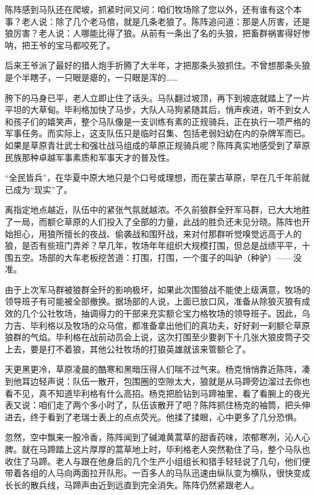 \par 陈阵感到马队还在爬坡，抓紧时间又问：咱们牧场除了您以外，还有谁有这个本事？老人说：除了几个老马倌，就是几条老狼了。陈阵追问道：那是人厉害，还是狼厉害？老人说：人哪能比得了狼。从前有一条出了名的头狼，把畜群祸害得好惨呐，把王爷的宝马都咬死了。
\par 后来王爷派了最好的猎人炮手折腾了大半年，才把那条头狼抓住。不曾想那条头狼是个半瞎子，一只眼是瘪的，一只眼是浑的……
\par 胯下的马身已平，老人立即止住了话头。马队翻过坡顶，再下到坡底就踏上了一片平坦的大草甸。毕利格加快了马步，大队人马狗紧随其后，悄声疾进，听不到女人和孩子们的嬉笑声，整个马队像是一支训练有素的正规骑兵，正在执行一项严格的军事任务。而实际上，这支队伍只是临时召集、包括老弱妇幼在内的杂牌军而已。如果是草原青壮武士和强壮战马组成的草原正规骑兵呢？陈阵真实地感受到了草原民族那种卓越军事素质和军事天才的普及性。
\par “全民皆兵”，在华夏中原大地只是个口号或理想，而在蒙古草原，早在几千年前就已成为“现实”了。
\par 离指定地点越近，队伍中的紧张气氛就越浓。不久前狼群全歼军马群，已大大地胜了一局，而额仑草原的人们投入了全部的力量，此战的胜负还未见分晓。陈阵也开始担心，用狼所擅长的夜战、偷袭战和围歼战，来对付那群听觉嗅觉远高于人的狼，是否有些班门弄斧？早几年，牧场年年组织大规模打围，但总是战绩平平，十围五空。场部的大车老板挖苦道：打围，打围，一个蛋子的叫驴（种驴）——没准。
\par 由于上次军马群被狼群全歼的影响极坏，如果此次围狼战不能使上级满意，牧场的领导班子有可能被全部撤换。据场部的人说，上面已放口风，准备从除狼灭狼有成效的几个公社牧场，抽调得力的干部来充实额仑宝力格牧场的领导班子。因此，乌力吉、毕利格以及牧场的众马倌，都准备拿出他们的真功夫，好好刹一刹额仑草原狼群的气焰。毕利格在战前动员会上说，这次打围至少要剥下十几张大狼皮筒子交上去，要是打不着狼，其他公社牧场的打狼英雄就该来管额仑了。
\par 天更黑更冷，草原凌晨的酷寒和黑暗压得人们喘不过气来。杨克悄悄靠近陈阵，凑到他耳边轻声说：队伍一散开，包围圈的空隙太大，狼就是从马蹄旁边溜过去你也看不见，真不知道毕利格有什么高招。杨克把脸钻到马蹄袖里，看了看腕上的夜光表又说：咱们走了两个多小时了，队伍该散开了吧？陈阵抓住杨克的袖筒，把头伸进去，终于看到了老瑞士表上的点点荧光。他揉了揉眼，心中更多了几分恐惧。
\par 忽然，空中飘来一股冷香，陈阵闻到了碱滩黄蒿草的甜香药味，浓郁寒冽，沁人心脾。就在马蹄踏上这片厚厚的蒿草地上时，毕利格老人突然勒住了马，整个马队也收住了马蹄。老人与跟在他身后的几个生产小组组长和猎手轻轻说了几句，他们便带着各组的人马向两面拉开队形。一百多人的马队迅速由纵队变为横队，很快变成长长的散兵线，马蹄声由近到远直到完全消失。陈阵仍然紧跟老人。
